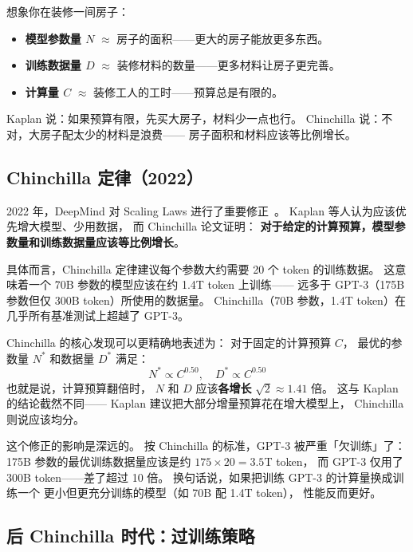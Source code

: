 \begin{keybox}
想象你在装修一间房子：
\begin{itemize}[noitemsep]
  \item \textbf{模型参数量 $N$} $\approx$ 房子的面积——更大的房子能放更多东西。
  \item \textbf{训练数据量 $D$} $\approx$ 装修材料的数量——更多材料让房子更完善。
  \item \textbf{计算量 $C$} $\approx$ 装修工人的工时——预算总是有限的。
\end{itemize}
Kaplan 说：如果预算有限，先买大房子，材料少一点也行。
Chinchilla 说：不对，大房子配太少的材料是浪费——
房子面积和材料应该等比例增长。
\end{keybox}

\subsection{Chinchilla 定律（2022）}

2022 年，DeepMind 对 Scaling Laws 进行了重要修正~\cite{hoffmann2022chinchilla}。
Kaplan 等人认为应该优先增大模型、少用数据，
而 Chinchilla 论文证明：
\textbf{对于给定的计算预算，模型参数量和训练数据量应该等比例增长}。

具体而言，Chinchilla 定律建议每个参数大约需要 20 个 token 的训练数据。
这意味着一个 70B 参数的模型应该在约 1.4T token 上训练——
远多于 GPT-3（175B 参数但仅 300B token）所使用的数据量。
Chinchilla（70B 参数，1.4T token）在几乎所有基准测试上超越了 GPT-3。

Chinchilla 的核心发现可以更精确地表述为：
对于固定的计算预算 $C$，
最优的参数量 $N^*$ 和数据量 $D^*$ 满足：
\begin{equation}
  N^* \propto C^{0.50}, \quad D^* \propto C^{0.50}
  \label{eq:chinchilla-optimal}
\end{equation}
也就是说，计算预算翻倍时，
$N$ 和 $D$ 应该\textbf{各增长} $\sqrt{2} \approx 1.41$ 倍。
这与 Kaplan 的结论截然不同——
Kaplan 建议把大部分增量预算花在增大模型上，
Chinchilla 则说应该均分。

这个修正的影响是深远的。
按 Chinchilla 的标准，GPT-3 被严重「欠训练」了：
175B 参数的最优训练数据量应该是约 $175 \times 20 = 3.5$T token，
而 GPT-3 仅用了 300B token——差了超过 10 倍。
换句话说，如果把训练 GPT-3 的计算量换成训练一个
更小但更充分训练的模型（如 70B 配 1.4T token），
性能反而更好。

\subsection{后 Chinchilla 时代：过训练策略}
\label{sec:overtraining}

